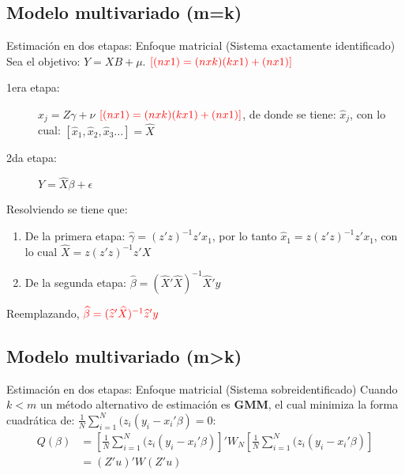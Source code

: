 \subsection{Modelo multivariado (m=k)}
\begin{frame}{Estimación en dos etapas: Enfoque matricial (Sistema exactamente identificado)}
	Sea el objetivo: $Y = XB+\mu.$ $\color{red}[(nx1)=(nxk)(kx1)+(nx1)]$
		\begin{description}
			\item[\color{blue}1era etapa:] $x_j=Z\gamma+\nu$ $\color{red}[(nx1)=(nxk)(kx1)+(nx1)]$, de donde se tiene: $\widehat x_j$, con lo cual: $\left[\widehat x_1, \widehat x_2,\widehat x_3... \right]=\widehat X $
			\item[\color{blue}2da etapa:] $Y=\widehat X \beta+\epsilon$
		\end{description}
	Resolviendo se tiene que:
		\begin{enumerate}
			\item {\color{blue}De la primera etapa:} $\widehat\gamma=(z'z)^{-1}z'x_1$, por lo tanto $\widehat x_1=z(z'z)^{-1}z'x_1$, con lo cual $\widehat X=z(z'z)^{-1}z'X$
			\item {\color{blue}De la segunda etapa:} $\widehat\beta=(\widehat X'\widehat X)^{-1}\widehat X' y$
		\end{enumerate}
	Reemplazando, ${\color{red}\widehat\beta=(\widehat z'\widehat X)^{-1}\widehat z'y}$
\end{frame}

\subsection{Modelo multivariado (m>k)}
\begin{frame}{Estimación en dos etapas: Enfoque matricial (Sistema sobreidentificado)}
	Cuando $k<m$ un método alternativo de estimación es \textbf{GMM}, el cual minimiza la forma cuadrática de: $\frac{1}{N}\sum_{i=1}^N(z_i(y_i-x_i'\beta) = 0$:
		\begin{align*}
			Q(\beta) & = \left[\frac{1}{N}\sum_{i=1}^N(z_i(y_i-x_i'\beta)\right]'  W_N  \left[\frac{1}{N}\sum_{i=1}^N(z_i(y_i-x_i'\beta)\right] \\
			& = (Z'u)' W (Z'u)
		\end{align*}
\end{frame}

